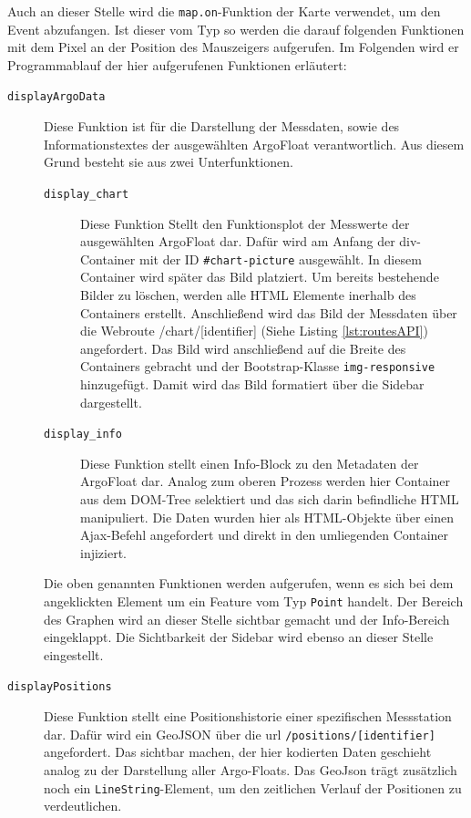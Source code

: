 Auch an dieser Stelle wird die \texttt{map.on}-Funktion der Karte verwendet, um den Event abzufangen. Ist dieser vom Typ  so werden die darauf folgenden Funktionen mit dem Pixel an der Position des Mauszeigers aufgerufen. Im Folgenden wird er Programmablauf der hier aufgerufenen Funktionen erläutert:

\begin{description}
 \item [\texttt{displayArgoData}] 
    Diese Funktion ist für die Darstellung der Messdaten, sowie des Informationstextes der ausgewählten ArgoFloat verantwortlich. Aus diesem Grund besteht sie aus zwei Unterfunktionen.
    \begin{description}
    \item [\texttt{display\_chart}] 
        Diese Funktion Stellt den Funktionsplot der Messwerte der ausgewählten ArgoFloat dar. Dafür wird am Anfang der div-Container mit der ID \texttt{\#chart-picture} ausgewählt. In diesem Container wird später das Bild platziert. Um bereits bestehende Bilder zu löschen, werden alle HTML Elemente inerhalb des Containers erstellt. Anschließend wird das Bild der Messdaten über die Webroute /chart/[identifier] (Siehe Listing \ref{lst:routesAPI}) angefordert. Das Bild wird anschließend auf die Breite des Containers gebracht und der Bootstrap-Klasse \texttt{img-responsive} hinzugefügt. Damit wird das Bild formatiert über die Sidebar dargestellt. 
    \item [\texttt{display\_info}]  
        Diese Funktion stellt einen Info-Block zu den Metadaten der ArgoFloat dar. Analog zum oberen Prozess werden hier Container aus dem DOM-Tree selektiert und das sich darin befindliche  HTML manipuliert. Die Daten wurden hier als HTML-Objekte über einen Ajax-Befehl angefordert und direkt in den umliegenden Container injiziert.
    \end{description}
    
    Die oben genannten Funktionen werden aufgerufen, wenn es sich bei dem angeklickten Element um ein Feature vom Typ \texttt{Point} handelt. Der Bereich des Graphen wird an dieser Stelle sichtbar gemacht und der Info-Bereich eingeklappt. Die Sichtbarkeit der Sidebar wird ebenso an dieser Stelle eingestellt.
    
 \item [\texttt{displayPositions}] 
    Diese Funktion stellt eine Positionshistorie einer spezifischen Messstation dar. Dafür wird ein GeoJSON über die url \texttt{/positions/[identifier]} angefordert. Das sichtbar machen, der hier kodierten Daten geschieht analog zu der Darstellung aller Argo-Floats. Das GeoJson trägt zusätzlich noch ein \texttt{LineString}-Element, um den zeitlichen Verlauf der Positionen zu verdeutlichen.
\end{description}





